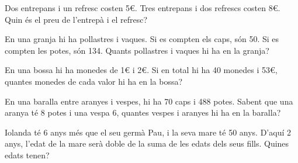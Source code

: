 \begin{activitats}
\begin{mylist}
\exer  Dos entrepans i un refresc costen 5€. Tres entrepans i dos refrescs costen 8€. Quin és el preu de l'entrepà i el refresc?

\exer  En una granja hi ha pollastres i vaques. Si es compten els caps, són 50. Si es compten les potes, són 134. Quants pollastres i vaques hi ha en la granja?


\exer  En una bossa hi ha monedes de 1€ i 2€. Si en total hi ha 40 monedes i 53€, quantes monedes de cada valor hi ha en la bossa?

\columnbreak

\exer  En una baralla entre aranyes i vespes, hi ha 70 caps i 488 potes. Sabent que una aranya té 8 potes i una vespa 6, quantes vespes i aranyes hi ha en la baralla?

\exer  Iolanda té 6 anys més que el seu germà Pau, i la seva mare té 50 anys. D'aquí 2 anys, l'edat de la mare serà doble de la suma de les edats dels seus fills. Quines edats tenen?

\end{mylist}
\end{activitats}

